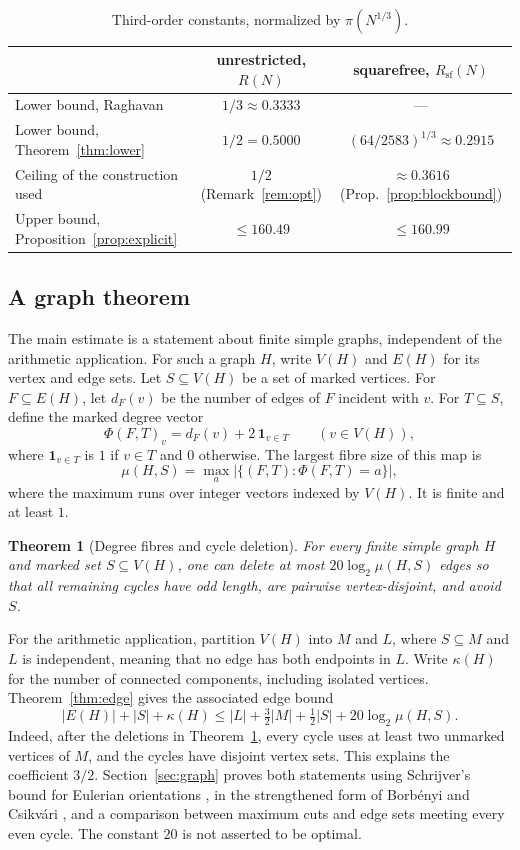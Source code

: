 \documentclass[11pt]{article}
\numberwithin{equation}{section}
\newtheorem{theorem}{Theorem}[section]
\theoremstyle{remark}
\begin{document}
\begin{table}[ht]
\centering
\caption{Third-order constants, normalized by $\pi(N^{1/3})$.}\label{tab:constants}
\begin{tabular}{@{}lcc@{}}
\toprule
& unrestricted, $R(N)$ & squarefree, $R_{\mathrm{sf}}(N)$\\
\midrule
Lower bound, Raghavan \cite{Raghavan} & $1/3\approx0.3333$ & --- \\
Lower bound, Theorem~\ref{thm:lower} & $1/2=0.5000$ & $(64/2583)^{1/3}\approx0.2915$\\
Ceiling of the construction used & $1/2$ (Remark~\ref{rem:opt}) & $\approx0.3616$ (Prop.~\ref{prop:blockbound})\\
Upper bound, Proposition~\ref{prop:explicit} & $\le160.49$ & $\le160.99$\\
\bottomrule
\end{tabular}
\end{table}

\subsection*{A graph theorem}
The main estimate is a statement about finite simple graphs, independent of the arithmetic application. For such a graph $H$, write $V(H)$ and $E(H)$ for its vertex and edge sets. Let $S\subseteq V(H)$ be a set of marked vertices. For $F\subseteq E(H)$, let $d_F(v)$ be the number of edges of $F$ incident with $v$. For $T\subseteq S$, define the marked degree vector
\[
\Phi(F,T)_v=d_F(v)+2\,\mathbf 1_{v\in T}\qquad(v\in V(H)),
\]
where $\mathbf 1_{v\in T}$ is $1$ if $v\in T$ and $0$ otherwise. The largest fibre size of this map is
\[
\mu(H,S)=\max_a\bigl|\{(F,T):\Phi(F,T)=a\}\bigr|,
\]
where the maximum runs over integer vectors indexed by $V(H)$. It is finite and at least $1$.

\begin{theorem}[Degree fibres and cycle deletion]\label{thm:deletion}
For every finite simple graph $H$ and marked set $S\subseteq V(H)$, one can delete at most $20\log_2\mu(H,S)$ edges so that all remaining cycles have odd length, are pairwise vertex-disjoint, and avoid $S$.
\end{theorem}

For the arithmetic application, partition $V(H)$ into $M$ and $L$, where $S\subseteq M$ and $L$ is independent, meaning that no edge has both endpoints in $L$. Write $\kappa(H)$ for the number of connected components, including isolated vertices. Theorem~\ref{thm:edge} gives the associated edge bound
\[
|E(H)|+|S|+\kappa(H)\le|L|+\tfrac32|M|+\tfrac12|S|+20\log_2\mu(H,S).
\]
Indeed, after the deletions in Theorem~\ref{thm:deletion}, every cycle uses at least two unmarked vertices of $M$, and the cycles have disjoint vertex sets. This explains the coefficient $3/2$. Section~\ref{sec:graph} proves both statements using Schrijver's bound for Eulerian orientations \cite{Schrijver}, in the strengthened form of Borb\'enyi and Csikv\'ari \cite[proof of Theorem~1.1]{BC}, and a comparison between maximum cuts and edge sets meeting every even cycle. The constant $20$ is not asserted to be optimal.
\end{document}
